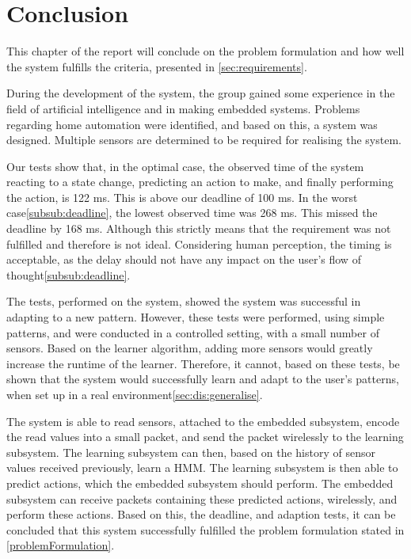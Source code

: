 \chapter{Conclusion}
This chapter of the report will conclude on the problem formulation and how well the system fulfills the criteria, presented in \cref{sec:requirements}.

During the development of the system, the group gained some experience in the field of artificial intelligence and in making embedded systems. Problems regarding home automation were identified, and based on this, a system was designed. Multiple sensors are determined to be required for realising the system.

Our tests show that, in the optimal case, the observed time of the system reacting to a state change, predicting an action to make, and finally performing the action, is 122 ms. This is above our deadline of 100 ms. In the worst case\cref{subsub:deadline}, the lowest observed time was 268 ms. This missed the deadline by 168 ms. Although this strictly means that the requirement was not fulfilled and therefore is not ideal. Considering human perception, the timing is acceptable, as the delay should not have any impact on the user's flow of thought\cref{subsub:deadline}.

The tests, performed on the system, showed the system was successful in adapting to a new pattern. However, these tests were performed, using simple patterns, and were conducted in a controlled setting, with a small number of sensors. Based on the learner algorithm, adding more sensors would greatly increase the runtime of the learner. Therefore, it cannot, based on these tests, be shown that the system would successfully learn and adapt to the user's patterns, when set up in a real environment\cref{sec:dis:generalise}.

The system is able to read sensors, attached to the embedded subsystem, encode the read values into a small packet, and send the packet wirelessly to the learning subsystem. The learning subsystem can then, based on the history of sensor values received previously, learn a HMM. The learning subsystem is then able to predict actions, which the embedded subsystem should perform. The embedded subsystem can receive packets containing these predicted actions, wirelessly, and perform these actions. Based on this, the deadline, and adaption tests, it can be concluded that this system successfully fulfilled the problem formulation stated in \cref{problemFormulation}.
